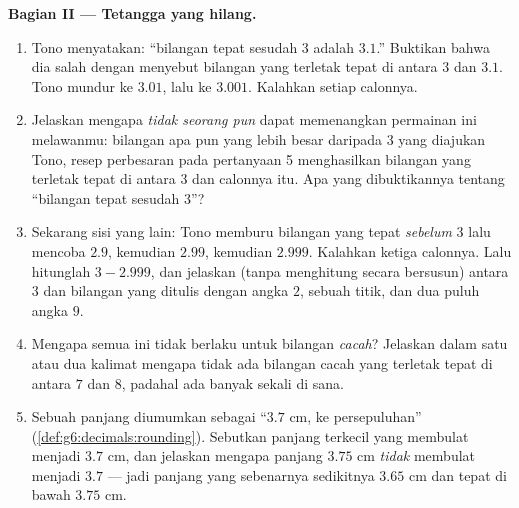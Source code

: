 \begin{problem}
\medskip
\noindent\textbf{Bagian II --- Tetangga yang hilang.}
\begin{enumerate}[resume]
  \item Tono menyatakan: ``bilangan tepat sesudah $3$ adalah $3.1$.''
        Buktikan bahwa dia salah dengan menyebut bilangan yang
        terletak tepat di antara $3$ dan $3.1$. Tono mundur ke
        $3.01$, lalu ke $3.001$. Kalahkan setiap calonnya.
  \item Jelaskan mengapa \emph{tidak seorang pun} dapat memenangkan
        permainan ini melawanmu: bilangan apa pun yang lebih besar
        daripada $3$ yang diajukan Tono, resep perbesaran pada
        pertanyaan 5 menghasilkan bilangan yang terletak tepat di
        antara $3$ dan calonnya itu. Apa yang dibuktikannya tentang
        ``bilangan tepat sesudah $3$''?
  \item Sekarang sisi yang lain: Tono memburu bilangan yang tepat
        \emph{sebelum} $3$ lalu mencoba $2.9$, kemudian $2.99$,
        kemudian $2.999$. Kalahkan ketiga calonnya. Lalu hitunglah
        $3 - 2.999$, dan jelaskan (tanpa menghitung secara bersusun)
         antara $3$ dan bilangan yang ditulis dengan angka
        $2$, sebuah titik, dan dua puluh angka $9$.
  \item Mengapa semua ini tidak berlaku untuk bilangan \emph{cacah}?
        Jelaskan dalam satu atau dua kalimat mengapa tidak ada
        bilangan cacah yang terletak tepat di antara $7$ dan $8$,
        padahal ada banyak sekali  di sana.
  \item Sebuah panjang diumumkan sebagai ``$3.7$ cm,  ke
        persepuluhan'' (\cref{def:g6:decimals:rounding}). Sebutkan
        panjang terkecil yang membulat menjadi $3.7$ cm, dan jelaskan
        mengapa panjang $3.75$ cm \emph{tidak} membulat menjadi $3.7$
        --- jadi panjang yang sebenarnya sedikitnya $3.65$ cm dan
        tepat di bawah $3.75$ cm.
\end{enumerate}


\end{problem}
